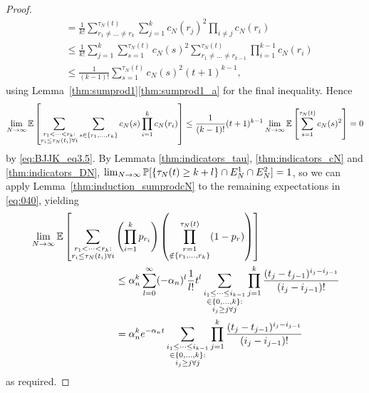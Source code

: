 \begin{proof}
\begin{align*}
&= \frac{1}{k!} \sum_{r_1 \neq \dots\neq r_k}^{\tau_N(t)}
        \sum_{j=1}^k c_N(r_j)^2
        \prod_{i\neq j} c_N(r_i) \\
&\leq \frac{1}{k!} 
        \sum_{j=1}^k \sum_{s=1}^{\tau_N(t)} c_N(s)^2
        \sum_{r_1 \neq \dots\neq r_{k-1}}^{\tau_N(t)}
        \prod_{i=1}^{k-1} c_N(r_i) \\
&\leq \frac{1}{(k-1)!} 
        \sum_{s=1}^{\tau_N(t)} c_N(s)^2
        (t+1)^{k-1} ,
\end{align*}
using Lemma~\ref{thm:sumprod1}\ref{thm:sumprod1_a} for the final inequality.
Hence
\begin{equation*}
\lim_{N\to\infty} \mathbb{E} \left[ \sum_{\substack{r_1 <\dots< r_k :\\ r_i \leq \tau_N(t_i) \forall i}}
        \sum_{s \in \{r_1,\dots,r_k\} } c_N(s) \prod_{i=1}^k c_N(r_i) \right]
\leq \frac{1}{(k-1)!} (t+1)^{k-1}
         \lim_{N\to\infty} \mathbb{E} \left[ \sum_{s=1}^{\tau_N(t)} c_N(s)^2 \right]
= 0 
\end{equation*}
by \eqref{eq:BJJK_eq3.5}.
By Lemmata \ref{thm:indicators_tau}, \ref{thm:indicators_cN} and \ref{thm:indicators_DN}, $\lim_{N\to\infty} \mathbb{P}[ \{ \tau_N(t)\geq k+l \} \cap E_N^1 \cap E_N^2 ] =1$,  so we can apply Lemma~\ref{thm:induction_sumprodcN} to the remaining expectations in \eqref{eq:040}, yielding
\begin{align*}
&\lim_{N\to\infty} \E \left[ 
        \sum_{\substack{r_1 <\dots< r_k :\\ r_i \leq \tau_N(t_i) \forall i}}
        \left( \prod_{i=1}^k p_{r_i} \right)
        \left( \prod_{\substack{r=1 \\ \notin \{r_1,\dots,r_k\} }}^{\tau_N(t)} 
        (1-p_r) \right) \right] \\
&\hspace{3cm}\leq \alpha_n^k
        \sum_{l=0}^{\infty} (-\alpha_n)^l \frac{1}{l!} t^l
        \sum_{\substack{i_1\leq \dots\leq i_{k-1}\\ \in \{0,\dots,k\} :
        \\ i_j \geq j \forall j}} 
        \prod_{j=1}^k \frac{(t_j - t_{j-1})^{i_j - i_{j-1}}}{(i_j - i_{j-1})! } \\
&\hspace{3cm}= \alpha_n^k e^{-\alpha_n t}
        \sum_{\substack{i_1\leq \dots\leq i_{k-1}\\ \in \{0,\dots,k\} :
        \\ i_j \geq j \forall j}} 
        \prod_{j=1}^k \frac{(t_j - t_{j-1})^{i_j - i_{j-1}}}{(i_j - i_{j-1})! }
\end{align*}
as required.
\end{proof}




